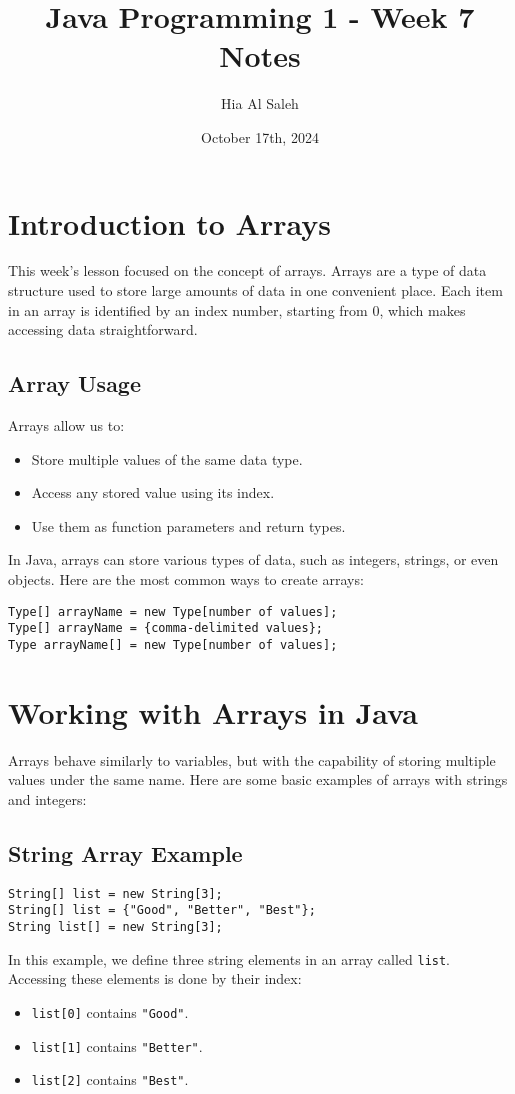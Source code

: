 \documentclass{article}
\title{Java Programming 1 - Week 7 Notes}
\author{Hia Al Saleh}
\date{October 17th, 2024}
\begin{document}
\maketitle
\tableofcontents
\newpage 

\section{Introduction to Arrays}
This week’s lesson focused on the concept of arrays. Arrays are a type of data structure used to store large amounts of data in one convenient place. Each item in an array is identified by an index number, starting from 0, which makes accessing data straightforward.

\subsection{Array Usage}
Arrays allow us to:
\begin{itemize}
    \item Store multiple values of the same data type.
    \item Access any stored value using its index.
    \item Use them as function parameters and return types.
\end{itemize}

In Java, arrays can store various types of data, such as integers, strings, or even objects. Here are the most common ways to create arrays:
\begin{lstlisting}
Type[] arrayName = new Type[number of values];
Type[] arrayName = {comma-delimited values};
Type arrayName[] = new Type[number of values];
\end{lstlisting}

\section{Working with Arrays in Java}
Arrays behave similarly to variables, but with the capability of storing multiple values under the same name. Here are some basic examples of arrays with strings and integers:

\subsection{String Array Example}
\begin{lstlisting}
String[] list = new String[3];
String[] list = {"Good", "Better", "Best"};
String list[] = new String[3];
\end{lstlisting}
In this example, we define three string elements in an array called \texttt{list}. Accessing these elements is done by their index:
\begin{itemize}
    \item \texttt{list[0]} contains \texttt{"Good"}.
    \item \texttt{list[1]} contains \texttt{"Better"}.
    \item \texttt{list[2]} contains \texttt{"Best"}.
\end{itemize}
\end{document}
